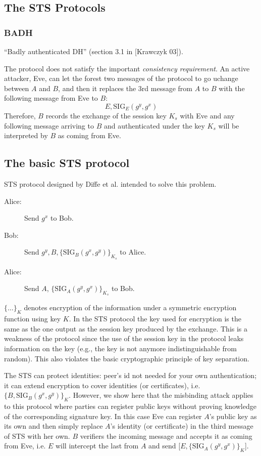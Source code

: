 \documentclass[11pt]{article}
\newcommand{\sig}{\text{SIG}}
\begin{document}
\subsection{The STS Protocols}
\subsubsection{BADH}
``Badly authenticated DH'' (section 3.1 in [Krawczyk 03]).

The protocol does not satisfy the important \emph{consistency requirement}. An active attacker, Eve, can let the forest two messages of the protocol to go uchange between $A$ and $B$, and then it replaces the 3rd message from $A$ to $B$ with the following message from Eve to $B$: $$E, \sig_E(g^y, g^x)$$
Therefore, $B$ records the exchange of the session key $K_s$ with Eve and any following message arriving to $B$ and authenticated under the key $K_s$ will be interpreted by $B$ as coming from Eve.
\subsection{The basic STS protocol}
STS protocol designed by Diffe et al. intended to solve this problem. 
\begin{description}
\item[Alice:] Send $g^x$ to Bob.
\item[Bob:] Send $g^y, B,\{\sig_B(g^x, g^y)\}_{K_s}$ to Alice.
\item[Alice:] Send $A$, $\{\sig_{A}(g^y, g^x)\}_{K_s}$ to Bob.
\end{description}
$\{\ldots\}_K$ denotes encryption of the information under a symmetric encryption function using key $K$. In the STS protocol the key used for encryption is the same as the one output as the session key produced by the exchange. This is a weakness of the protocol since the use of the session key in the protocol leaks information on the key (e.g., the key is not anymore indistinguishable from random). This also violates the basic cryptographic principle of key separation. 

The STS can protect identities: peer's id not needed for your own authentication; it can extend encryption to cover identities (or certificates), i.e. $\{B, \sig_B(g^x, g^y)\}_K$. However, we show here that the misbinding attack applies to this protocol where parties can register public keys without proving knowledge of the corresponding signature key. In this case Eve can register $A$'s public key as its own and then simply replace $A$'s identity (or certificate) in the third message of STS with her own. $B$ verifiers the incoming message and accepts it as coming from Eve, i.e. $E$ will intercept the last from $A$ and send [$E, \{\sig_A(g^y, g^x)\}_K$]. 
\end{document}
